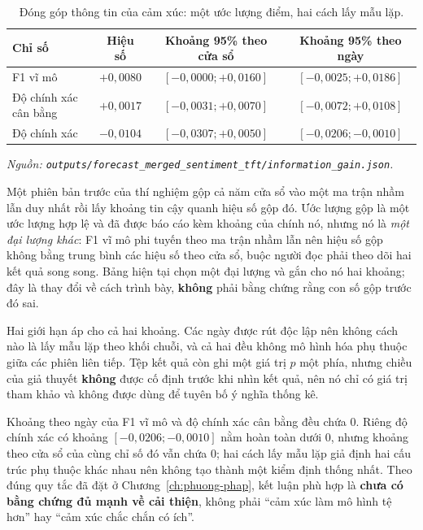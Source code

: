 \begin{table}[H]
  \centering
  \caption{Đóng góp thông tin của cảm xúc: một ước lượng điểm, hai cách lấy mẫu lặp.}
  \label{tab:kq-ablation-ci}
  \begin{tabular}{l c c c}
    \toprule
    Chỉ số & Hiệu số & Khoảng 95\% theo cửa sổ & Khoảng 95\% theo ngày \\
    \midrule
    F1 vĩ mô & $+0{,}0080$ & $[-0{,}0000; +0{,}0160]$ & $[-0{,}0025; +0{,}0186]$ \\
    Độ chính xác cân bằng & $+0{,}0017$ & $[-0{,}0031; +0{,}0070]$ & $[-0{,}0072; +0{,}0108]$ \\
    Độ chính xác & $-0{,}0104$ & $[-0{,}0307; +0{,}0050]$ & $[-0{,}0206; -0{,}0010]$ \\
    \bottomrule
  \end{tabular}
\noindent\textit{Nguồn: \texttt{outputs/forecast\_merged\_sentiment\_tft/information\_gain.json}.}
\end{table}

Một phiên bản trước của thí nghiệm gộp cả năm cửa sổ vào một ma trận nhầm lẫn duy nhất rồi
lấy khoảng tin cậy quanh hiệu số gộp đó. Ước lượng gộp là một ước lượng hợp lệ và đã được
báo cáo kèm khoảng của chính nó, nhưng nó là \textit{một đại lượng khác}: F1 vĩ mô phi
tuyến theo ma trận nhầm lẫn nên hiệu số gộp không bằng trung bình các hiệu số theo cửa sổ,
buộc người đọc phải theo dõi hai kết quả song song. Bảng hiện tại chọn một đại lượng và
gắn cho nó hai khoảng; đây là thay đổi về cách trình bày, \textbf{không} phải bằng chứng
rằng con số gộp trước đó sai.

Hai giới hạn áp cho cả hai khoảng. Các ngày được rút độc lập nên không cách nào là lấy mẫu
lặp theo khối chuỗi, và cả hai đều không mô hình hóa phụ thuộc giữa các phiên liên tiếp.
Tệp kết quả còn ghi một giá trị $p$ một phía, nhưng chiều của giả thuyết \textbf{không}
được cố định trước khi nhìn kết quả, nên nó chỉ có giá trị tham khảo và không được dùng để
tuyên bố ý nghĩa thống kê.

Khoảng theo ngày của F1 vĩ mô và độ chính xác cân bằng đều chứa 0. Riêng độ chính xác có
khoảng $[-0{,}0206; -0{,}0010]$ nằm hoàn toàn dưới 0, nhưng khoảng theo cửa sổ của cùng chỉ
số đó vẫn chứa 0; hai cách lấy mẫu lặp giả định hai cấu trúc phụ thuộc khác nhau nên không
tạo thành một kiểm định thống nhất. Theo đúng quy tắc đã đặt ở
Chương~\ref{ch:phuong-phap}, kết luận phù hợp là \textbf{chưa có bằng chứng đủ mạnh về
cải thiện}, không phải ``cảm xúc làm mô hình tệ hơn'' hay ``cảm xúc chắc chắn có ích''.

